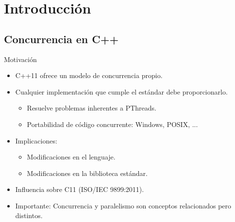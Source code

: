 \section{Introducción}

\subsection{Concurrencia en C++}

\begin{frame}{Motivación}
\begin{itemize}
  \item C++11 ofrece un modelo de concurrencia propio.
  \item Cualquier implementación que cumple el estándar debe proporcionarlo.
    \begin{itemize}
      \item Resuelve problemas inherentes a PThreads.
      \item Portabilidad de código concurrente: Windows, POSIX, ...
    \end{itemize}
  \item Implicaciones:
    \begin{itemize}
      \item Modificaciones en el lenguaje.
      \item Modificaciones en la biblioteca estándar.
    \end{itemize}
  \item Influencia sobre C11 (ISO/IEC 9899:2011).
  \item \alert{Importante}: Concurrencia y paralelismo son conceptos relacionados pero distintos.
\end{itemize}
\end{frame}

